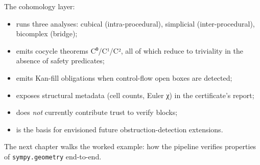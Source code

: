 The cohomology layer:
\begin{itemize}[leftmargin=1.7em]
  \item runs three analyses: cubical (intra-procedural), simplicial
    (inter-procedural), bicomplex (bridge);
  \item emits cocycle theorems C⁰/C¹/C², all of which reduce to
    triviality in the absence of safety predicates;
  \item emits Kan-fill obligations when control-flow open boxes
    are detected;
  \item exposes structural metadata (cell counts, Euler χ) in the
    certificate's report;
  \item does \emph{not} currently contribute trust to verify
    blocks;
  \item is the basis for envisioned future obstruction-detection
    extensions.
\end{itemize}

The next chapter walks the worked example: how the pipeline
verifies properties of \texttt{sympy.geometry} end-to-end.
